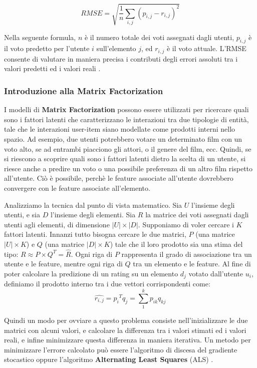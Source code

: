\documentclass[12pt]{article}
\begin{document}
\[ RMSE=\sqrt{\frac{1}{n}\sum_{{i,j}}(p_{i,j}-r_{i,j})^2} \]

Nella seguente formula, $n$ è il numero totale dei voti assegnati dagli utenti, $p_{i,j}$ è il voto predetto per l'utente $i$ sull'elemento $j$, ed $r_{i,j}$ è il voto attuale. L'RMSE consente di valutare in maniera precisa i contributi degli errori assoluti tra i valori predetti ed i valori reali \cite{Su:2009:SCF:1592474.1722966}.
 
\subsubsection{Introduzione alla Matrix Factorization}
I modelli di \textbf{Matrix Factorization} possono essere utilizzati per ricercare quali sono i fattori latenti che caratterizzano le interazioni tra due tipologie di entità, tale che le interazioni user-item siano modellate come prodotti interni nello spazio. Ad esempio, due utenti potrebbero votare un determinato film con un voto alto, se ad entrambi piacciono gli attori, o il genere del film, ecc. Quindi, se si riescono a scoprire quali sono i fattori latenti dietro la scelta di un utente, si riesce anche a predire un voto o una possibile preferenza di un altro film rispetto all'utente. Ciò è possibile, perchè le feature associate all'utente dovrebbero convergere con le feature associate all'elemento.

Analizziamo la tecnica dal punto di vista matematico. Sia $U$ l'insieme degli utenti, e sia $D$ l'insieme degli elementi. Sia $R$ la matrice dei voti assegnati dagli utenti agli elementi, di dimensione $\lvert U\rvert\times\lvert D\rvert$. Supponiamo di voler cercare i $K$ fattori latenti. Innanzi tutto bisogna cercare le due matrici, $P$ (una matrice $\lvert U\rvert\times K$) e $Q$ (una matrice $\lvert D\rvert\times K$) tale che il loro prodotto sia una stima del tipo: $R\approx P\times Q^T=\hat{R}$. Ogni riga di $P$ rappresenta il grado di associazione tra un utente e le feature, mentre ogni riga di $Q$ tra un elemento e le feature. Al fine di poter calcolare la predizione di un rating su un elemento $d_j$ votato dall'utente $u_i$, definiamo il prodotto interno tra i due vettori corrispondenti come:
\[\hat{r_{i,j}}={p_i}^Tq_j=\sum_{1}^{k}p_{ik}q_{kj}\]

Quindi un modo per ovviare a questo problema consiste nell'inizializzare le due matrici con alcuni valori, e calcolare la differenza tra i valori stimati ed i valori reali, e infine minimizzare questa differenza in maniera iterativa. Un metodo per minimizzare l'errore calcolato può essere l'algoritmo di discesa del gradiente stocastico oppure l'algoritmo \textbf{Alternating Least Squares} (ALS) \cite{Takacs:2008:MFN:1454008.1454049}.
\end{document}

